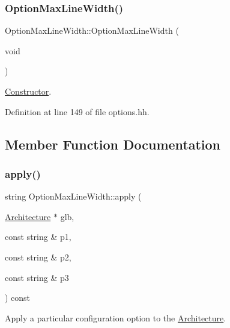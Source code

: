 \subsubsection{\texorpdfstring{OptionMaxLineWidth()}{OptionMaxLineWidth()}}
{\footnotesize\ttfamily Option\+Max\+Line\+Width\+::\+Option\+Max\+Line\+Width (\begin{DoxyParamCaption}\item[{void}]{ }\end{DoxyParamCaption})\hspace{0.3cm}{\ttfamily [inline]}}



\mbox{\hyperlink{class_constructor}{Constructor}}. 



Definition at line 149 of file options.\+hh.



\subsection{Member Function Documentation}
\mbox{\label{class_option_max_line_width_a07c124f2e4fb139ae10e94033b0ed232}} 
\subsubsection{\texorpdfstring{apply()}{apply()}}
{\footnotesize\ttfamily string Option\+Max\+Line\+Width\+::apply (\begin{DoxyParamCaption}\item[{\mbox{\hyperlink{class_architecture}{Architecture}} $\ast$}]{glb,  }\item[{const string \&}]{p1,  }\item[{const string \&}]{p2,  }\item[{const string \&}]{p3 }\end{DoxyParamCaption}) const\hspace{0.3cm}{\ttfamily [virtual]}}



Apply a particular configuration option to the \mbox{\hyperlink{class_architecture}{Architecture}}. 


